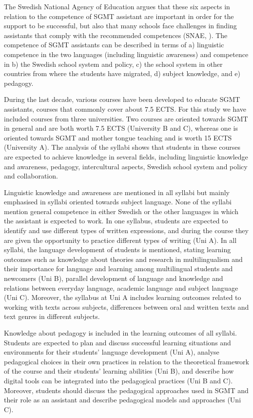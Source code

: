 \documentclass[output=paper]{langscibook}
\begin{document}
The Swedish National Agency of Education  argues that these six aspects in relation to the competence of SGMT assistant are important in order for the support to be successful, but also that many schools face challenges in finding assistants that comply with the recommended competences  (SNAE, \citealt{Swedish_national_agency_of_education2015}). The competence of SGMT assistants can be described in terms of a) linguistic competence in the two languages (including linguistic awareness) and competence in b) the Swedish school system and policy, c) the school system in other countries from where the students have migrated, d) subject knowledge, and e) pedagogy.

During the last decade, various courses have been developed to educate SGMT assistants, courses that commonly cover about 7.5 ECTS. For this study we have included courses from three universities. Two courses are oriented towards SGMT in general and are both worth 7.5 ECTS (University B and C), whereas one is oriented towards SGMT and mother tongue teaching and is worth 15 ECTS (University A). The analysis of the syllabi shows that students in these courses are expected to achieve knowledge in several fields, including linguistic knowledge and awareness, pedagogy, intercultural aspects, Swedish school system and policy and collaboration.

Linguistic knowledge and awareness are mentioned in all syllabi but mainly emphasised in syllabi oriented towards subject language. None of the syllabi mention general competence in either Swedish or the other languages in which the assistant is expected to work. In one syllabus, students are expected to identify and use different types of written expressions, and during the course they are given the opportunity to practice different types of writing (Uni A). In all syllabi, the language development of students is mentioned, stating learning outcomes such as knowledge about theories and research in multilingualism and their importance for language and learning among multilingual students and newcomers (Uni B), parallel development of language and knowledge and relations between everyday language, academic language and subject language (Uni C). Moreover, the syllabus at Uni A includes learning outcomes related to working with texts across subjects, differences between oral and written texts and text genres in different subjects.  

Knowledge about pedagogy is included in the learning outcomes of all syllabi. Students are expected to plan and discuss successful learning situations and environments for their students’ language development (Uni A), analyse pedagogical choices in their own practices in relation to the theoretical framework of the course and their students’ learning abilities (Uni B), and describe how digital tools can be integrated into the pedagogical practices (Uni B and C). Moreover, students should discuss the pedagogical approaches used in SGMT and their role as an assistant and describe pedagogical models and approaches (Uni C). 
\end{document}
